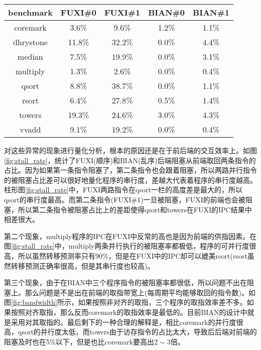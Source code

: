 \begin{table}[!htbp]
	\label{tab:stall_rate}
	\centering
	\footnotesize%
	\setlength{\tabcolsep}{4pt}%
	\renewcommand{\arraystretch}{1.2}%
	\begin{tabular}{ccccc}
		\hline
		benchmark   & FUXI\#0 & FUXI\#1 & BIAN\#0& BIAN\#1\\%
		\hline
		coremark    & 3.6\%  & 9.6\%  & 1.2\% & 1.1\% \\
		dhrystone   & 11.8\% & 32.2\% & 0.0\% & 4.4\% \\
		median 		& 7.5\%  & 19.9\% & 0.0\% & 3.1\% \\
		multiply 	& 1.3\%  & 2.6\%  & 0.0\% & 0.4\% \\
		qsort  		& 8.8\%  & 38.7\% & 0.0\% & 1.1\% \\
		rsort  		& 6.4\%  & 27.8\% & 0.5\% & 1.4\% \\
		towers 		& 19.3\% & 24.6\% & 3.0\% & 4.3\% \\
		vvadd 		& 9.1\%  & 19.2\% & 0.0\% & 0.4\% \\
		\hline
	\end{tabular}
\end{table}
	
对这些异常的现象进行量化分析，根本的原因还是在于前后端的交互效率上。如图\ref{fig:stall_rate}，统计了FUXI(顺序)和BIAN(乱序)后端阻塞从前端取回两条指令的占比。因为如果第一条指令阻塞了，第二条指令也会跟着阻塞，所以两路并行指令的被阻塞占比差可以很好地量化程序的串行度，差越大代表着程序的串行度越高。柱形图\ref{fig:stall_rate}中，FUXI两路指令在qsort一栏的高度差是最大的，所以qsort的串行度最高。而第二条指令(FUXI\#1)一旦被阻塞，FUXI的前端也会被阻塞，所以第二条指令被阻塞占比上的差距使得qsort和towers在FUXI的IPC结果中相差很大。

第二个现象，multiply程序的IPC在FUXI中反常的高也是因为前端的供指因素。在图\ref{fig:stall_rate}中，multiply两条并行执行的被阻塞率都极低，程序的可并行度很高，所以虽然转移预测率只有90\%，但是在FUXI中的IPC却可以媲美rsort(rsort虽然转移预测正确率很高，但是其串行度也较高)。

第三个现象，由于在BIAN中三个程序指令的被阻塞率都很低，所以问题不出在阻塞上。那么问题是不是出在前端的取指带宽上(每周期平均能够取回的指令数)。如图\ref{fig:bandwidth}所示，如果按照非对齐的取指，三个程序的取指效率差不多。如果按照对齐取指，那么反而coremark的取指效率是最低的。目前BIAN的设计中就是采用对其取指的。最后剩下的一种合理的解释是，相比coremark的并行度很高，qsort的并行度太低，而towers由于访存指令的占比太大，导致后后端对前端的阻塞及时也在5\%以下，但是也比coremark要高出$2 \sim 3$倍。


